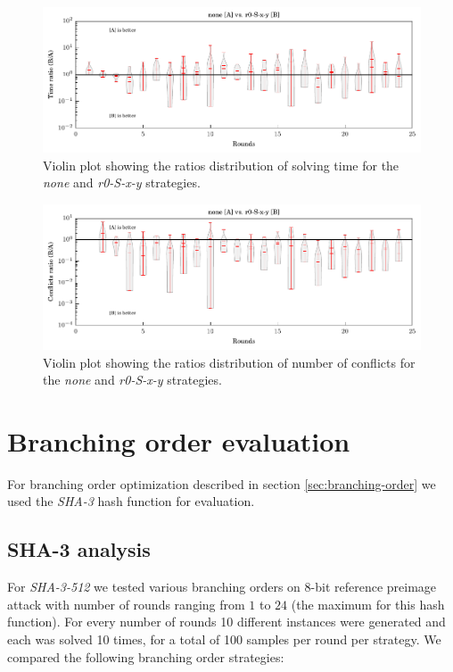 \begin{figure}
\centering \includegraphics{figures/bo-ex1/ratio-time-none-r0sxy.pdf}
\caption{Violin plot showing the ratios distribution of solving time for the \emph{none} and \emph{r0-S-x-y} strategies.}
\label{fig:bo-ratio-time-none-r0sxy}
\end{figure}

\begin{figure}
\centering \includegraphics{figures/bo-ex1/ratio-confl-none-r0sxy.pdf}
\caption{Violin plot showing the ratios distribution of number of conflicts for the \emph{none} and \emph{r0-S-x-y} strategies.}
\label{fig:bo-ratio-confl-none-r0sxy}
\end{figure}

\section{Branching order evaluation}
For branching order optimization described in section \ref{sec:branching-order} we used the \emph{SHA-3} hash function for evaluation.

\subsection{SHA-3 analysis}
For \emph{SHA-3-512} we tested various branching orders on $8$-bit reference preimage attack with number of rounds ranging from $1$ to $24$ (the maximum for this hash function).
For every number of rounds 10 different instances were generated and each was solved 10 times, for a total of 100 samples per round per strategy.
We compared the following branching order strategies:

